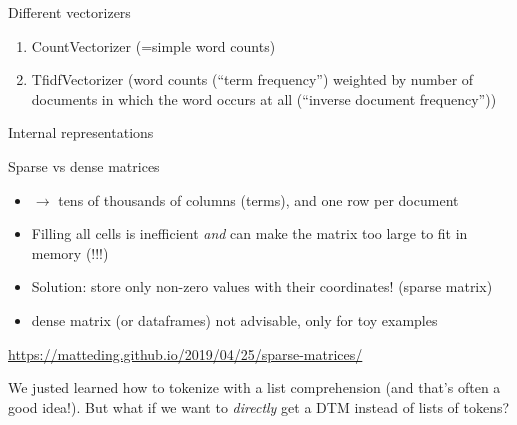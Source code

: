 \documentclass[compress]{beamer}
\begin{document}
\begin{frame}{Different vectorizers}
	\begin{enumerate}[<+->]
		\item CountVectorizer (=simple word counts)
		\item TfidfVectorizer (word counts (``term frequency'') weighted by number of documents in which the word occurs at all (``inverse document frequency''))
	\end{enumerate}
\end{frame}

\begin{frame}{Internal representations}
	\begin{block}{Sparse vs dense matrices}
		\begin{itemize}
			\item $\rightarrow$ tens of thousands of columns (terms), and one row per document
			\item Filling all cells is inefficient \emph{and} can make the matrix too large to fit in memory (!!!)
			\item Solution: store only non-zero values with their coordinates! (sparse matrix)
			\item dense matrix (or dataframes) not advisable, only for toy examples
		\end{itemize}
	\end{block}
\end{frame}


{
	\begin{frame}
		\url{https://matteding.github.io/2019/04/25/sparse-matrices/}
	\end{frame}
}


\begin{frame}[standout]
We justed learned how to tokenize with a list comprehension (and that's often a good idea!). But what if we want to \emph{directly} get a DTM instead of lists of tokens?
\end{frame}
\end{document}

